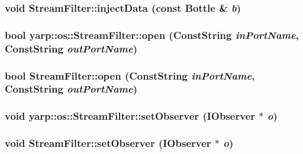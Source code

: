 \label{classyarp_1_1os_1_1_stream_filter_a86214ed7527aca2157153c2ee3899afd}
\hypertarget{classyarp_1_1os_1_1_stream_filter_a0dad0b2389fa998afc9336509569a01f}{
\subsubsection[{injectData}]{\setlength{\rightskip}{0pt plus 5cm}void StreamFilter::injectData (const Bottle \& {\em b})}}
\label{classyarp_1_1os_1_1_stream_filter_a0dad0b2389fa998afc9336509569a01f}
\hypertarget{classyarp_1_1os_1_1_stream_filter_a0e0fdc84804bc82ae32c1100d8ad19db}{
\subsubsection[{open}]{\setlength{\rightskip}{0pt plus 5cm}bool yarp::os::StreamFilter::open (ConstString {\em inPortName}, \/  ConstString {\em outPortName})}}
\label{classyarp_1_1os_1_1_stream_filter_a0e0fdc84804bc82ae32c1100d8ad19db}
\hypertarget{classyarp_1_1os_1_1_stream_filter_aa2203de7321cabb2eb8e8a28b66cc470}{
\subsubsection[{open}]{\setlength{\rightskip}{0pt plus 5cm}bool StreamFilter::open (ConstString {\em inPortName}, \/  ConstString {\em outPortName})}}
\label{classyarp_1_1os_1_1_stream_filter_aa2203de7321cabb2eb8e8a28b66cc470}
\hypertarget{classyarp_1_1os_1_1_stream_filter_a9e7a3182eaf634a5e80e55411c5019b9}{
\subsubsection[{setObserver}]{\setlength{\rightskip}{0pt plus 5cm}void yarp::os::StreamFilter::setObserver ({\bf IObserver} $\ast$ {\em o})}}
\label{classyarp_1_1os_1_1_stream_filter_a9e7a3182eaf634a5e80e55411c5019b9}
\hypertarget{classyarp_1_1os_1_1_stream_filter_a6f911f0b7818d212d58f05fe82c096a1}{
\subsubsection[{setObserver}]{\setlength{\rightskip}{0pt plus 5cm}void StreamFilter::setObserver ({\bf IObserver} $\ast$ {\em o})}}
\label{classyarp_1_1os_1_1_stream_filter_a6f911f0b7818d212d58f05fe82c096a1}


